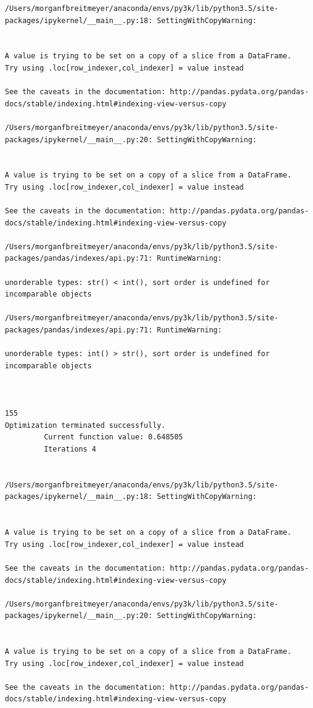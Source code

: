 \begin{lstlisting}
/Users/morganfbreitmeyer/anaconda/envs/py3k/lib/python3.5/site-packages/ipykernel/__main__.py:18: SettingWithCopyWarning:


A value is trying to be set on a copy of a slice from a DataFrame.
Try using .loc[row_indexer,col_indexer] = value instead

See the caveats in the documentation: http://pandas.pydata.org/pandas-docs/stable/indexing.html#indexing-view-versus-copy

/Users/morganfbreitmeyer/anaconda/envs/py3k/lib/python3.5/site-packages/ipykernel/__main__.py:20: SettingWithCopyWarning:


A value is trying to be set on a copy of a slice from a DataFrame.
Try using .loc[row_indexer,col_indexer] = value instead

See the caveats in the documentation: http://pandas.pydata.org/pandas-docs/stable/indexing.html#indexing-view-versus-copy

/Users/morganfbreitmeyer/anaconda/envs/py3k/lib/python3.5/site-packages/pandas/indexes/api.py:71: RuntimeWarning:

unorderable types: str() < int(), sort order is undefined for incomparable objects

/Users/morganfbreitmeyer/anaconda/envs/py3k/lib/python3.5/site-packages/pandas/indexes/api.py:71: RuntimeWarning:

unorderable types: int() > str(), sort order is undefined for incomparable objects



155
Optimization terminated successfully.
         Current function value: 0.648505
         Iterations 4


/Users/morganfbreitmeyer/anaconda/envs/py3k/lib/python3.5/site-packages/ipykernel/__main__.py:18: SettingWithCopyWarning:


A value is trying to be set on a copy of a slice from a DataFrame.
Try using .loc[row_indexer,col_indexer] = value instead

See the caveats in the documentation: http://pandas.pydata.org/pandas-docs/stable/indexing.html#indexing-view-versus-copy

/Users/morganfbreitmeyer/anaconda/envs/py3k/lib/python3.5/site-packages/ipykernel/__main__.py:20: SettingWithCopyWarning:


A value is trying to be set on a copy of a slice from a DataFrame.
Try using .loc[row_indexer,col_indexer] = value instead

See the caveats in the documentation: http://pandas.pydata.org/pandas-docs/stable/indexing.html#indexing-view-versus-copy


\end{lstlisting}
